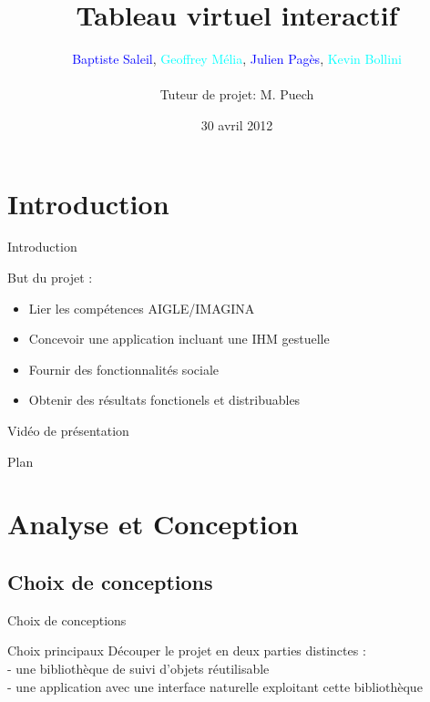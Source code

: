 \documentclass{beamer}
\title{Tableau virtuel interactif}
\author{\textcolor{blue}{Baptiste Saleil}, \textcolor{cyan}{Geoffrey Mélia}, \textcolor{blue}{Julien Pagès}, \textcolor{cyan}{Kevin Bollini} \\ \ \\Tuteur de projet: M. Puech}
\date{30 avril 2012}
\begin{document}
	\begin{frame}
		\titlepage
	\end{frame}

	\section{Introduction}
	\begin{frame}{Introduction}
        
	\begin{block}{But du projet :}
               \begin{itemize}
			\item Lier les compétences AIGLE/IMAGINA
			\item Concevoir une application incluant une IHM gestuelle
			\item Fournir des fonctionnalités sociale
			\item Obtenir des résultats fonctionels et distribuables
		\end{itemize}
        \end{block}
            
	\end{frame}

      \begin{frame}{Vidéo de présentation}
      \end{frame}

      \begin{frame}{Plan}
            \tableofcontents[hideallsubsections]
      \end{frame}
            
      \section{Analyse et Conception}
      \subsection{Choix de conceptions}
            \begin{frame}{Choix de conceptions}
                  \begin{block}{Choix principaux}
                        Découper le projet en deux parties distinctes : \\
                        - une bibliothèque de suivi d'objets réutilisable \\
                        - une application avec une interface naturelle exploitant cette bibliothèque \\
                  \end{block}
            \end{frame}
            
\end{document}
